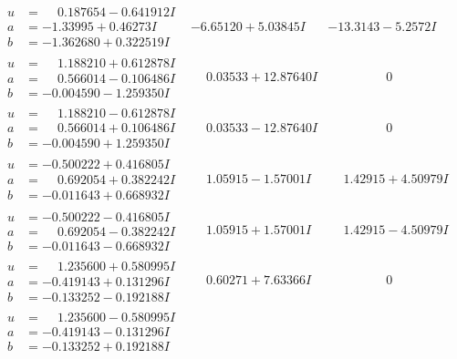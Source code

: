 \documentclass[1p]{elsarticle_modified}
\theoremstyle{definition}
\begin{document}
$$\begin{array}{c|c|c}
\begin{aligned}
u &= \phantom{-}0.187654 - 0.641912 I \\
a &= -1.33995 + 0.46273 I \\
b &= -1.362680 + 0.322519 I\end{aligned}
 & -6.65120 + 5.03845 I & -13.3143 - 5.2572 I \\ \hline\begin{aligned}
u &= \phantom{-}1.188210 + 0.612878 I \\
a &= \phantom{-}0.566014 - 0.106486 I \\
b &= -0.004590 - 1.259350 I\end{aligned}
 & \phantom{-}0.03533 + 12.87640 I & \phantom{-0.000000 } 0 \\ \hline\begin{aligned}
u &= \phantom{-}1.188210 - 0.612878 I \\
a &= \phantom{-}0.566014 + 0.106486 I \\
b &= -0.004590 + 1.259350 I\end{aligned}
 & \phantom{-}0.03533 - 12.87640 I & \phantom{-0.000000 } 0 \\ \hline\begin{aligned}
u &= -0.500222 + 0.416805 I \\
a &= \phantom{-}0.692054 + 0.382242 I \\
b &= -0.011643 + 0.668932 I\end{aligned}
 & \phantom{-}1.05915 - 1.57001 I & \phantom{-}1.42915 + 4.50979 I \\ \hline\begin{aligned}
u &= -0.500222 - 0.416805 I \\
a &= \phantom{-}0.692054 - 0.382242 I \\
b &= -0.011643 - 0.668932 I\end{aligned}
 & \phantom{-}1.05915 + 1.57001 I & \phantom{-}1.42915 - 4.50979 I \\ \hline\begin{aligned}
u &= \phantom{-}1.235600 + 0.580995 I \\
a &= -0.419143 + 0.131296 I \\
b &= -0.133252 - 0.192188 I\end{aligned}
 & \phantom{-}0.60271 + 7.63366 I & \phantom{-0.000000 } 0 \\ \hline\begin{aligned}
u &= \phantom{-}1.235600 - 0.580995 I \\
a &= -0.419143 - 0.131296 I \\
b &= -0.133252 + 0.192188 I\end{aligned}

\end{array}$$
\end{document}
